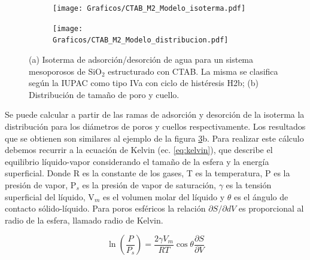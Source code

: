 			\begin{figure}[!ht]
		     	  		\begin{subfigure}[t]{0.491\textwidth}
		     	  		\texttt{[image: Graficos/CTAB\_M2\_Modelo\_isoterma.pdf]}
						\label{fig:pea_ej1}
						\end{subfigure}
						\begin{subfigure}[t]{0.495\textwidth}
		     	  		\texttt{[image: Graficos/CTAB\_M2\_Modelo\_distribucion.pdf]}
						\label{fig:pea_ej2}
						\end{subfigure}
						\vspace*{-0.6cm}
						\caption[Isoterma de adsorción/desorción tipo IVa, H2b.]{(a) Isoterma de adsorción/desorción de agua para un sistema mesoporosos de SiO$_2$ estructurado con CTAB. La misma se clasifica según la IUPAC como tipo IVa con ciclo de histéresis H2b; (b) Distribución de tamaño de poro y cuello.}
						\label{fig:pea_ej}
						\end{figure}			
		\vspace{0.3cm}				
		Se puede calcular a partir de las ramas de adsorción y desorción de la isoterma la distribución para los diámetros de poros y cuellos respectivamente. Los resultados que se obtienen son similares al ejemplo de la figura \ref{fig:pea_ej}b. Para realizar este cálculo debemos recurrir a la ecuación de Kelvin (ec. \ref{eq:kelvin}), que describe el equilibrio líquido-vapor considerando el tamaño de la esfera y la energía superficial. Donde R es la constante de los gases, T es la temperatura, P es la presión de vapor, P$_s$ es la presión de vapor de saturación, $\gamma$ es la tensión superficial del líquido, V$_m$ es el volumen molar del líquido y $\theta$ es el ángulo de contacto sólido-líquido. \cite{Baklanov2000,Boissiere2005,Sing1985} Para poros esféricos la relación $\partial S/ \partial dV$ es proporcional al radio de la esfera, llamado radio de Kelvin.\cite{FernandezPrini2005}
		
			\begin{equation}
			  	 \ln \left(\frac{P}{P_s}\right)=\frac{2\gamma V_m}{RT} \cos{\theta}\frac{\partial S}{\partial V}
			     \label{eq:kelvin}
			 	 \end{equation}					
	
